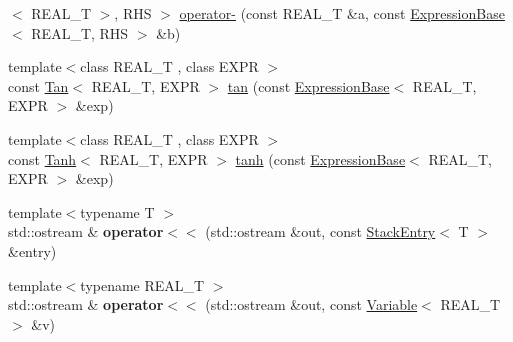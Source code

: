 \begin{DoxyCompactItemize}
$<$ R\+E\+A\+L\+\_\+\+T $>$, R\+H\+S $>$ \hyperlink{namespaceatl_abd3391908236b9e394815845eb2513ef}{operator-\/} (const R\+E\+A\+L\+\_\+\+T \&a, const \hyperlink{structatl_1_1_expression_base}{Expression\+Base}$<$ R\+E\+A\+L\+\_\+\+T, R\+H\+S $>$ \&b)
\item 
{\footnotesize template$<$class R\+E\+A\+L\+\_\+\+T , class E\+X\+P\+R $>$ }\\const \hyperlink{structatl_1_1_tan}{Tan}$<$ R\+E\+A\+L\+\_\+\+T, E\+X\+P\+R $>$ \hyperlink{namespaceatl_a7300a4e56f9b9e8fccbf26ce40568016}{tan} (const \hyperlink{structatl_1_1_expression_base}{Expression\+Base}$<$ R\+E\+A\+L\+\_\+\+T, E\+X\+P\+R $>$ \&exp)
\item 
{\footnotesize template$<$class R\+E\+A\+L\+\_\+\+T , class E\+X\+P\+R $>$ }\\const \hyperlink{structatl_1_1_tanh}{Tanh}$<$ R\+E\+A\+L\+\_\+\+T, E\+X\+P\+R $>$ \hyperlink{namespaceatl_a45a9d5040b0342960165dea5074a52a6}{tanh} (const \hyperlink{structatl_1_1_expression_base}{Expression\+Base}$<$ R\+E\+A\+L\+\_\+\+T, E\+X\+P\+R $>$ \&exp)
\item 
\hypertarget{namespaceatl_a86db58f209047340cf00da03561c5cc7}{{\footnotesize template$<$typename T $>$ }\\std\+::ostream \& {\bfseries operator$<$$<$} (std\+::ostream \&out, const \hyperlink{structatl_1_1_stack_entry}{Stack\+Entry}$<$ T $>$ \&entry)}\label{namespaceatl_a86db58f209047340cf00da03561c5cc7}

\item 
\hypertarget{namespaceatl_aafd33b6e930419b55b40f5e07063d3ca}{{\footnotesize template$<$typename R\+E\+A\+L\+\_\+\+T $>$ }\\std\+::ostream \& {\bfseries operator$<$$<$} (std\+::ostream \&out, const \hyperlink{structatl_1_1_variable}{Variable}$<$ R\+E\+A\+L\+\_\+\+T $>$ \&v)}\label{namespaceatl_aafd33b6e930419b55b40f5e07063d3ca}


\end{DoxyCompactItemize}
